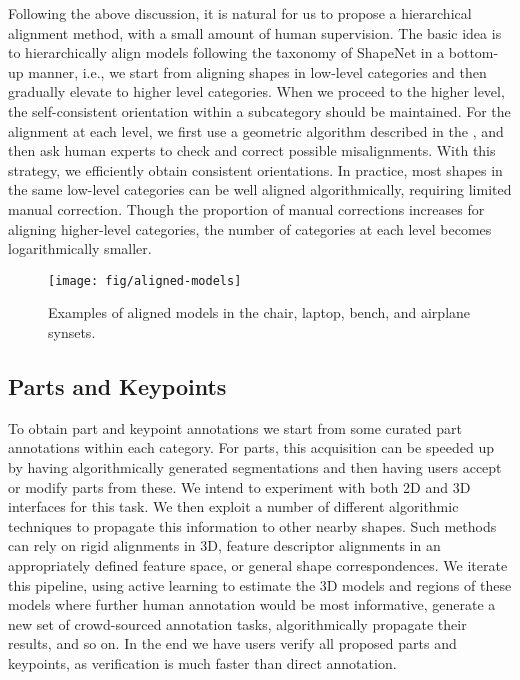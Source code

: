 Following the above discussion, it is natural for us to propose a hierarchical alignment method, with a small amount of human supervision.  The basic idea is to hierarchically align models following the taxonomy of ShapeNet in a bottom-up manner, i.e., we start from aligning shapes in low-level categories and then gradually elevate to higher level categories. When we proceed to the higher level, the self-consistent orientation within a subcategory should be maintained. For the alignment at each level, we first use a geometric algorithm described in the , and then ask human experts to check and correct possible misalignments.  With this strategy, we efficiently obtain consistent orientations.  In practice, most shapes in the same low-level categories can be well aligned algorithmically, requiring limited manual correction.  Though the proportion of manual corrections increases for aligning higher-level categories, the number of categories at each level becomes logarithmically smaller.

\begin{figure}[t]
	\texttt{[image: fig/aligned-models]}
	\caption{Examples of aligned models in the chair, laptop, bench, and airplane synsets.}
	\label{fig:rigid_alignment}
\end{figure}

\subsection{Parts and Keypoints}
To obtain part and keypoint annotations we start from some curated part annotations within each category. For parts, this acquisition can be speeded up by having  algorithmically generated segmentations and then having users accept or modify parts from these. We intend to experiment with both 2D and 3D interfaces for this task. We then exploit a number of different algorithmic techniques to propagate this information to other nearby shapes. Such methods can rely on rigid alignments in 3D, feature descriptor alignments in an appropriately defined feature space, or general shape correspondences. We iterate this pipeline, using active learning to estimate the 3D models and regions of these models where further human annotation would be most informative, generate a new set of crowd-sourced annotation tasks, algorithmically propagate their results, and so on. In the end we have users verify all proposed parts and keypoints, as verification is much faster than direct annotation.\label{sec:parts}

